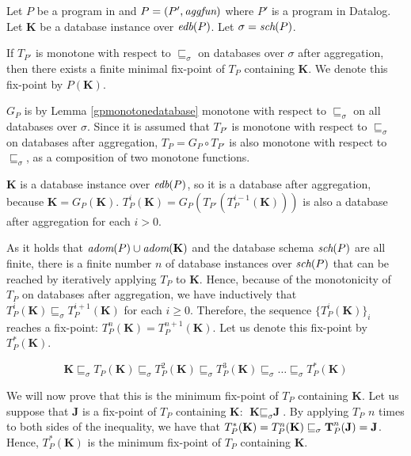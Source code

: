 \begin{thm}
Let $P$ be a program in \datalogra and $P = (P', \textit{aggfun})$ where $P'$ is a program in Datalog. Let $\textbf{K}$ be a database instance over $\textit{edb}(P)$. Let $\sigma = \textit{sch}(P)$.

If $T_{P'}$ is monotone with respect to $\sqsubseteq_\sigma$ on databases over $\sigma$ after aggregation, then there exists a finite minimal fix-point of $T_P$ containing $\textbf{K}$. We denote this fix-point by $P(\textbf{K})$.
\end{thm}
\begin{prof}
$G_P$ is by Lemma \ref{gpmonotonedatabase} monotone with respect to $\sqsubseteq_\sigma$ on all databases over $\sigma$. Since it is assumed that $T_{P'}$ is monotone with respect to $\sqsubseteq_\sigma$ on databases after aggregation, $T_P = G_P \circ T_{P'}$ is also monotone with respect to $\sqsubseteq_\sigma$, as a composition of two monotone functions. 

$\textbf{K}$ is a database instance over $\textit{edb}(P)$, so it is a database after aggregation, because $\textbf{K} = G_P(\textbf{K})$.  $T_P^i(\textbf{K}) = G_P(T_{P'}(T_P^{i-1}(\textbf{K})))$ is also a database after aggregation for each $i > 0$.

As it holds that $\textit{adom}(P) \cup \textit{adom}(\textbf{K})$ and the database schema $\textit{sch}(P)$ are all finite, there is a finite number $n$ of database instances over $\textit{sch}(P)$ that can be reached by iteratively applying $T_P$ to $\textbf{K}$. Hence, because of the monotonicity of $T_P$ on databases after aggregation, we have inductively that $T_P^i(\textbf{K}) \sqsubseteq_\sigma T_P^{i+1}(\textbf{K})$ for each $i \ge 0$. Therefore, the sequence $\{T_P^i(\textbf{K})\}_i$ reaches a fix-point: $T_P^n(\textbf{K}) = T_P^{n+1}(\textbf{K})$. Let us denote this fix-point by $T_P^*(\textbf{K})$.

$$\textbf{K} \sqsubseteq_\sigma T_P(\textbf{K}) \sqsubseteq_\sigma T_P^2(\textbf{K}) \sqsubseteq_\sigma T_P^3(\textbf{K}) \sqsubseteq_\sigma \dots \sqsubseteq_\sigma T_P^*(\textbf{K}) $$


We will now prove that this is the minimum fix-point of $T_P$ containing $\textbf{K}$. Let us suppose that $\textbf{J}$ is a fix-point of $T_P$ containing  $\textbf{K}$:  $\textbf{K} \sqsubseteq_\sigma \textbf{J}$. By applying $T_P$ $n$ times to both sides of the inequality, we have that $T_P^*(\textbf{K}) = T_P^n(\textbf{K}) \sqsubseteq_\sigma \textbf T_P^n(\textbf{J}) = \textbf{J}$. Hence, $T_P^*(\textbf{K})$ is the minimum fix-point of $T_P$ containing $\textbf{K}$.
\QEDA
\end{prof}

